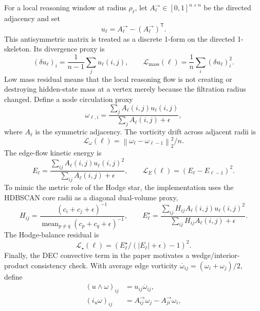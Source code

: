 \documentclass[11pt]{article}
\theoremstyle{definition}
\theoremstyle{plain}
\theoremstyle{remark}
\numberwithin{equation}{section}
\newcommand{\norm}[1]{\left\lVert #1\right\rVert}
\newcommand{\transpose}{^{\mathsf T}}
\begin{document}
For a local reasoning window at radius $\rho_\ell$, let $A_\ell^\rightarrow\in[0,1]^{n\times n}$ be the directed adjacency and set
\begin{equation}
  u_\ell=A_\ell^\rightarrow-(A_\ell^\rightarrow)\transpose .
\end{equation}
This antisymmetric matrix is treated as a discrete 1-form on the directed 1-skeleton.  Its divergence proxy is
\begin{equation}
  (\delta u_\ell)_i=\frac1{n-1}\sum_{j}u_\ell(i,j),
  \qquad
  \mathcal L_{\mathrm{mass}}(\ell)=\frac1n\sum_i(\delta u_\ell)_i^2.
\end{equation}
Low mass residual means that the local reasoning flow is not creating or destroying hidden-state mass at a vertex merely because the filtration radius changed.  Define a node circulation proxy
\begin{equation}
  \omega_{\ell,i}
  =
  \frac{\sum_j A_\ell(i,j)u_\ell(i,j)}
       {\sum_j A_\ell(i,j)+\epsilon},
\end{equation}
where $A_\ell$ is the symmetric adjacency.  The vorticity drift across adjacent radii is
\begin{equation}
  \mathcal L_{\omega}(\ell)=\norm{\omega_\ell-\omega_{\ell-1}}_2^2/n.
\end{equation}
The edge-flow kinetic energy is
\begin{equation}
  E_\ell=\frac{\sum_{ij}A_\ell(i,j)u_\ell(i,j)^2}{\sum_{ij}A_\ell(i,j)+\epsilon},
  \qquad
  \mathcal L_E(\ell)=(E_\ell-E_{\ell-1})^2.
\end{equation}
To mimic the metric role of the Hodge star, the implementation uses the HDBSCAN core radii as a diagonal dual-volume proxy,
\begin{equation}
  H_{ij}=\frac{(c_i+c_j+\epsilon)^{-1}}
              {\operatorname{mean}_{p\ne q}(c_p+c_q+\epsilon)^{-1}},
  \qquad
  E_\ell^\star=
  \frac{\sum_{ij}H_{ij}A_\ell(i,j)u_\ell(i,j)^2}
       {\sum_{ij}H_{ij}A_\ell(i,j)+\epsilon}.
\end{equation}
The Hodge-balance residual is
\begin{equation}
  \mathcal L_\star(\ell)=\left(E_\ell^\star/(|E_\ell|+\epsilon)-1\right)^2.
\end{equation}
Finally, the DEC convective term in the paper motivates a wedge/interior-product consistency check.  With average edge vorticity $\overline\omega_{ij}=(\omega_i+\omega_j)/2$, define
\begin{align}
  (u\wedge\omega)_{ij} &= u_{ij}\overline\omega_{ij},\\
  (i_u\omega)_{ij} &= A^\rightarrow_{ij}\omega_j-A^\rightarrow_{ji}\omega_i,
\end{align}
\end{document}
